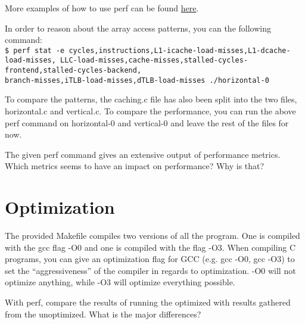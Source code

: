 More examples of how to use perf can be found \href{https://www.brendangregg.com/perf.html}{here}.

In order to reason about the array access patterns, you can the following command: \\
\texttt{\$ perf stat -e cycles,instructions,L1-icache-load-misses,L1-dcache-load-misses, LLC-load-misses,cache-misses,stalled-cycles-frontend,stalled-cycles-backend, \\
branch-misses,iTLB-load-misses,dTLB-load-misses ./horizontal-0}

To compare the patterns, the caching.c file has also been split into the two files, horizontal.c and vertical.c. To compare the performance, you can run the above perf command on horizontal-0 and vertical-0 and leave the rest of the files for now. 

The given perf command gives an extensive output of performance metrics. Which metrics seems to have an impact on performance? Why is that?

\section*{Optimization}
The provided Makefile compiles two versions of all the program. One is compiled with the gcc flag -O0 and one is compiled with the flag -O3. When compiling C programs, you can give an optimization flag for GCC (e.g. gcc -O0, gcc -O3) to set the “aggressiveness” of the compiler in regards to optimization. -O0 will not optimize anything, while -O3 will optimize everything possible.

With perf, compare the results of running the optimized with results gathered from the unoptimized. What is the major differences?

